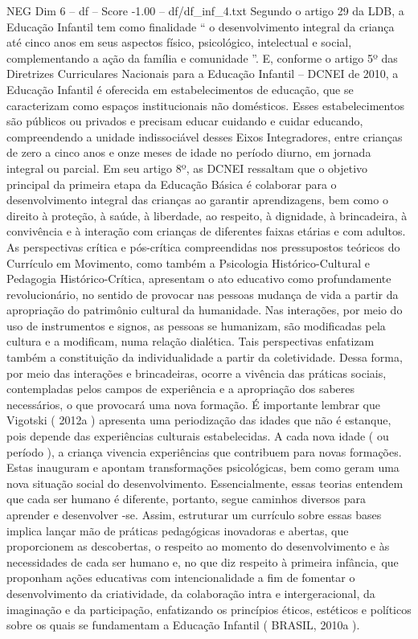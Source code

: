 \begin{textsample}{NEG Dim 6 – df – Score -1.00 – df/df\_inf\_4.txt}
Segundo o artigo 29 da LDB, a Educação Infantil tem como finalidade “ o desenvolvimento integral da criança até cinco anos em seus aspectos físico, psicológico, intelectual e social, complementando a ação da família e comunidade ”.
E, conforme o artigo 5º das Diretrizes Curriculares Nacionais para a Educação Infantil – DCNEI de 2010, a Educação Infantil é oferecida em estabelecimentos de educação, que se caracterizam como espaços institucionais não domésticos.
Esses estabelecimentos são públicos ou privados e precisam educar cuidando e cuidar educando, compreendendo a unidade indissociável desses Eixos Integradores, entre crianças de zero a cinco anos e onze meses de idade no período diurno, em jornada integral ou parcial.
Em seu artigo 8º, as DCNEI ressaltam que o objetivo principal da primeira etapa da Educação Básica é colaborar para o desenvolvimento integral das crianças ao garantir aprendizagens, bem como o direito à proteção, à saúde, à liberdade, ao respeito, à dignidade, à brincadeira, à convivência e à interação com crianças de diferentes faixas etárias e com adultos.
As perspectivas crítica e pós-crítica compreendidas nos pressupostos teóricos do Currículo em Movimento, como também a Psicologia Histórico-Cultural e Pedagogia Histórico-Crítica, apresentam o ato educativo como profundamente revolucionário, no sentido de provocar nas pessoas mudança de vida a partir da apropriação do patrimônio cultural da humanidade.
Nas interações, por meio do uso de instrumentos e signos, as pessoas se humanizam, são modificadas pela cultura e a modificam, numa relação dialética.
Tais perspectivas enfatizam também a constituição da individualidade a partir da coletividade.
Dessa forma, por meio das interações e brincadeiras, ocorre a vivência das práticas sociais, contempladas pelos campos de experiência e a apropriação dos saberes necessários, o que provocará uma nova formação.
É importante lembrar que Vigotski ( 2012a ) apresenta uma periodização das idades que não é estanque, pois depende das experiências culturais estabelecidas.
A cada nova idade ( ou período ), a criança vivencia experiências que contribuem para novas formações.
Estas inauguram e apontam transformações psicológicas, bem como geram uma nova situação social do desenvolvimento.
Essencialmente, essas teorias entendem que cada ser humano é diferente, portanto, segue caminhos diversos para aprender e desenvolver -se.
Assim, estruturar um currículo sobre essas bases implica lançar mão de práticas pedagógicas inovadoras e abertas, que proporcionem as descobertas, o respeito ao momento do desenvolvimento e às necessidades de cada ser humano e, no que diz respeito à primeira infância, que proponham ações educativas com intencionalidade a fim de fomentar o desenvolvimento da criatividade, da colaboração intra e intergeracional, da imaginação e da participação, enfatizando os princípios éticos, estéticos e políticos sobre os quais se fundamentam a Educação Infantil ( BRASIL, 2010a ).

\end{textsample}
